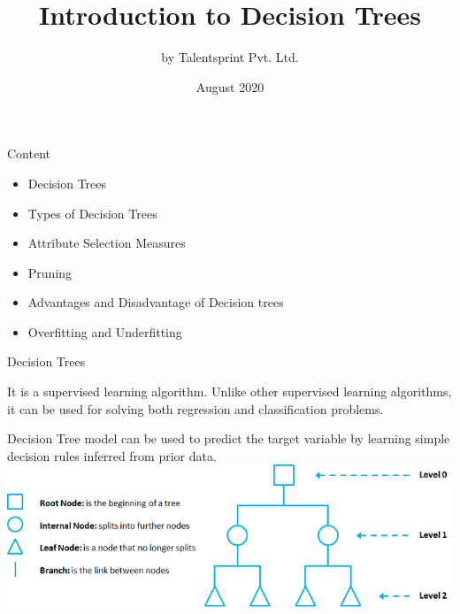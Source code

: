 \documentclass{beamer}
\title{Introduction to Decision Trees}
\author{by Talentsprint Pvt. Ltd.}
\date{August 2020}
\begin{document}
\maketitle
\begin{frame}{Content}
	\begin{itemize}
		\item Decision Trees
		\item Types of Decision Trees
		\item Attribute Selection Measures
		\item Pruning
		\item Advantages and Disadvantage of Decision trees
		\item Overfitting and Underfitting
	\end{itemize}
\end{frame}

\begin{frame}{Decision Trees}
\begin{flushleft}
	It is a supervised learning algorithm. Unlike other supervised learning algorithms, it can be used for solving both regression and classification problems.
\vspace{10pt}

Decision Tree model can be used to predict the target variable by learning simple decision rules inferred from prior data.\\
\vspace{10pt}
\includegraphics[scale=0.48]{DT_structure}
\end{flushleft}
\end{frame}
\end{document}
